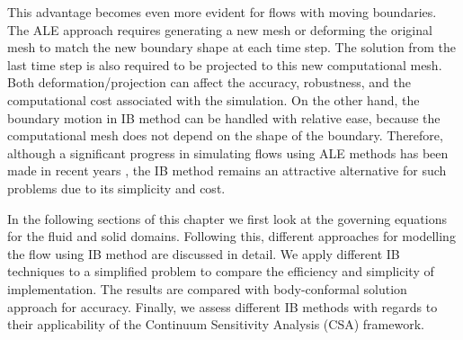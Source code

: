 This advantage becomes even more evident for flows with moving boundaries. The ALE approach requires generating a new mesh or deforming the original mesh to match the new boundary shape at each time step. The solution from the last time step is also required to be projected to this new computational mesh. Both deformation/projection can affect the accuracy, robustness, and the computational cost associated with the simulation. On the other hand, the boundary motion in IB method can be handled with relative ease, because the computational mesh does not depend on the shape of the boundary. Therefore, although a significant progress in simulating flows using ALE methods has been made in recent years \cite{lomtev1999discontinuous, farhat2004cfd, cheng2005fluid}, the IB method remains an attractive alternative for such problems due to its simplicity and cost.

In the following sections of this chapter we first look at the governing equations for the fluid and solid domains. Following this, different approaches for modelling the flow using IB method are discussed in detail. We apply different IB techniques to a simplified problem to compare the efficiency and simplicity of implementation. The results are compared with body-conformal solution approach for accuracy. Finally, we assess different IB methods with regards to their applicability of the Continuum Sensitivity Analysis (CSA) framework.

